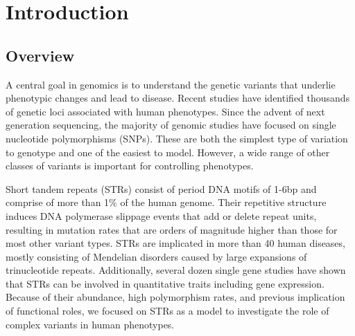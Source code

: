 \iffalse  \fi

\chapter{Introduction}

\section{Overview}

A central goal in genomics is to understand the genetic variants that underlie phenotypic changes and lead to disease. Recent studies have identified thousands of genetic loci associated with human phenotypes. Since the advent of next generation sequencing, the majority of genomic studies have focused on single nucleotide polymorphisms (SNPs). These are both the simplest type of variation to genotype and one of the easiest to model. However, a wide range of other classes of variants is important for controlling phenotypes.

Short tandem repeats (STRs) consist of period DNA motifs of 1-6bp and comprise of more than 1\% of the human genome. Their repetitive structure induces DNA polymerase slippage events that add or delete repeat units, resulting in mutation rates that are orders of magnitude higher than those for most other variant types. STRs are implicated in more than 40 human diseases, mostly consisting of Mendelian disorders caused by large expansions of trinucleotide repeats. Additionally, several dozen single gene studies have shown that STRs can be involved in quantitative traits including gene expression. Because of their abundance, high polymorphism rates, and previous implication of functional roles, we focused on STRs as a model to investigate the role of complex variants in human phenotypes.

